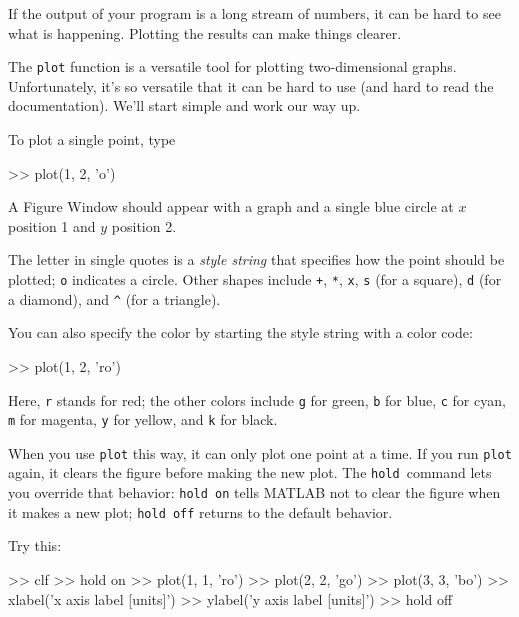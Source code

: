 \documentclass[../../book.tex]{subfiles}
\begin{document}

If the output of your program is a long stream of numbers, it can be hard to see what is happening.
Plotting the results can make things clearer.

The \lstinline{plot} function is a versatile tool for plotting two-dimensional graphs.  Unfortunately, it's so versatile that it can be hard to use (and hard to read the documentation).
We'll start simple and work our way up.

To plot a single point, type

\begin{code}
>> plot(1, 2, 'o')
\end{code}

A Figure Window should appear with a graph and a single blue circle at $x$ position 1 and $y$ position 2.


The letter in single quotes is a \emph{style string} that specifies how the
point should be plotted;  \lstinline{o} indicates a circle.
Other shapes include \lstinline{+},
\lstinline{*},
\lstinline{x},
\lstinline{s} (for a square),
\lstinline{d} (for a diamond), and
\lstinline{^} (for a triangle).

You can also specify the color by starting the style string with a color code:

\begin{code}
>> plot(1, 2, 'ro')
\end{code}

Here, \lstinline{r} stands for red; the other colors include \lstinline{g} for green, \lstinline{b} for blue, \lstinline{c} for cyan, \lstinline{m} for magenta, \lstinline{y} for yellow, and \lstinline{k} for black.

When you use \lstinline{plot} this way, it can only plot one point at a
time.  If you run \lstinline{plot} again, it clears the figure before making
the new plot.  The \lstinline{hold}~command lets you override that behavior:
\lstinline{hold on} tells MATLAB not to clear the figure when it makes a new
plot; \lstinline{hold off} returns to the default behavior.


Try this:

\begin{code}
>> clf
>> hold on
>> plot(1, 1, 'ro')
>> plot(2, 2, 'go')
>> plot(3, 3, 'bo')
>> xlabel('x axis label [units]')
>> ylabel('y axis label [units]')
>> hold off
\end{code}
\end{document}
